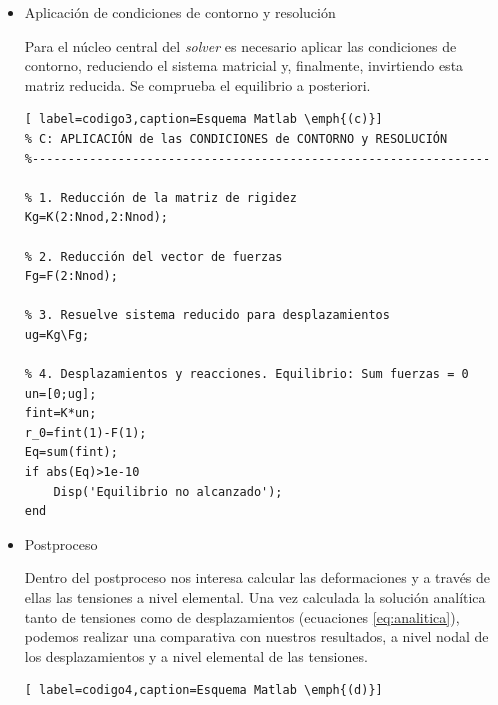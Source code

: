 \documentclass[spanish,a4paper,12pt]{article}
\begin{document}
\begin{itemize}
\begin{lstlisting}[ label=codigo2,caption=Esquema Matlab \emph{(b)}]
% 1. Matriz de rigidez elemental (común a todos los elementos)
k=(E*A/h)*[1,-1;-1,1];  

% 2. Ensamblaje de la matriz global
for i=1:Nele
    K(i:i+1,i:i+1)=K(i:i+1,i:i+1)+k;        % ensambla rigidez
end

% 3. Ensamblaje del vector de fuerzas volumetricas global
for i=1:Nele
    % vector elemental de cargas distribuidas
    fvol=(h/6)*[2*q(i)+q(i+1);q(i)+2*q(i+1)];
    % ensambla cargas
    F(i:i+1)=F(i:i+1)+fvol;                    
end

% 4. Suma del vector de fuerzas externas
Fext(Nnod)=Fext(Nnod)+P;
F=F+Fext;           % suma cargas en contorno y cargas distribuidas
\end{lstlisting}

\item Aplicación de condiciones de contorno y resolución

Para el núcleo central del \textit{solver} es necesario aplicar las condiciones de contorno, reduciendo el sistema matricial y, finalmente, invirtiendo esta matriz reducida. Se comprueba el equilibrio a posteriori.

\begin{lstlisting}[ label=codigo3,caption=Esquema Matlab \emph{(c)}]
% C: APLICACIÓN de las CONDICIONES de CONTORNO y RESOLUCIÓN
%----------------------------------------------------------------

% 1. Reducción de la matriz de rigidez
Kg=K(2:Nnod,2:Nnod);

% 2. Reducción del vector de fuerzas
Fg=F(2:Nnod);

% 3. Resuelve sistema reducido para desplazamientos
ug=Kg\Fg;

% 4. Desplazamientos y reacciones. Equilibrio: Sum fuerzas = 0
un=[0;ug];
fint=K*un;
r_0=fint(1)-F(1);
Eq=sum(fint);
if abs(Eq)>1e-10
    Disp('Equilibrio no alcanzado');
end
\end{lstlisting}

\item Postproceso

Dentro del postproceso nos interesa calcular las deformaciones y a través de ellas las tensiones a nivel elemental. Una vez calculada la solución analítica tanto de tensiones como de desplazamientos (ecuaciones \eqref{eq:analitica}), podemos  realizar una comparativa con nuestros resultados, a nivel nodal de los desplazamientos y a nivel elemental de las tensiones.

\begin{lstlisting}[ label=codigo4,caption=Esquema Matlab \emph{(d)}]


\end{lstlisting}
\end{itemize}
\end{document}
